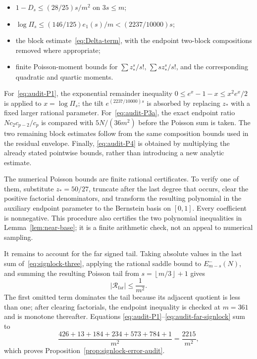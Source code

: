 \documentclass[11pt]{article}
\theoremstyle{definition}
\theoremstyle{remark}
\newcommand{\floor}[1]{\left\lfloor #1\right\rfloor}
\begin{document}
\begin{itemize}[leftmargin=2em]
 \item $1-D_s\le(28/25)s/m^2$ on $3s\le m$;
 \item
 $\log\Pi_s\le(146/125)e_1(s)/m< (2237/10000)s$;
 \item the block estimate~\eqref{eq:Delta-term}, with the endpoint
 two-block compositions removed where appropriate;
 \item finite Poisson-moment bounds for
 $\sum z_*^s/s!$, $\sum sz_*^s/s!$, and the corresponding quadratic and
 quartic moments.
\end{itemize}
For~\eqref{eq:audit-P1}, the exponential remainder inequality
$0\le e^x-1-x\le x^2e^x/2$ is applied to $x=\log\Pi_s$; the tilt
$e^{(2237/10000)s}$ is absorbed by replacing $z_*$ with a fixed larger
rational parameter.  For~\eqref{eq:audit-P3a}, the exact endpoint ratio
$Nc_2c_{p-2}/c_p$ is compared with $5N/(36m^2)$ before the Poisson sum is
taken.  The two remaining block estimates follow from the same composition
bounds used in the residual envelope.  Finally,
\eqref{eq:audit-P4} is obtained by multiplying the already stated pointwise
bounds, rather than introducing a new analytic estimate.

The numerical Poisson bounds are finite rational certificates.  To verify one
of them, substitute $z_*=50/27$, truncate after the last degree that occurs,
clear the positive factorial denominators, and transform the resulting
polynomial in the auxiliary endpoint parameter to the Bernstein basis on
$[0,1]$.  Every coefficient is nonnegative.  This procedure also certifies the
two polynomial inequalities in Lemma~\ref{lem:near-base}; it is a finite
arithmetic check, not an appeal to numerical sampling.

It remains to account for the far signed tail.  Taking absolute values in the
last sum of~\eqref{eq:signlock-three}, applying the rational saddle bound to
$E^-_{m-s}(N)$, and summing the resulting Poisson tail from
$s=\floor{m/3}+1$ gives
\begin{equation}\label{eq:audit-far-signlock}
 |\mathcal R_{\mathrm{far}}|\le\frac1{m^2}.
\end{equation}
The first omitted term dominates the tail because its adjacent quotient is
less than one; after clearing factorials, the endpoint inequality is checked
at $m=361$ and is monotone thereafter.  Equations
\eqref{eq:audit-P1}--\eqref{eq:audit-far-signlock} sum to
\[
 \frac{426+13+184+234+573+784+1}{m^2}
 =\frac{2215}{m^2},
\]
which proves Proposition~\ref{prop:signlock-error-audit}.
\end{document}
